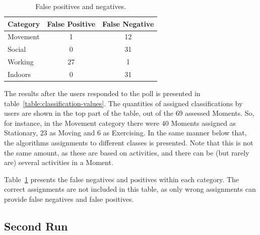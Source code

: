 \begin{table}
    \centering
    {\begin{tabular}{ | l | c | c |}
        \hline
            Category & False Positive & False Negative \\
        \hline
        Movement    & 1  & 12 \\
        Social      & 0  & 31 \\
        Working     & 27 & 1  \\
        Indoors     & 0  & 31 \\
        \hline
    \end{tabular}}
    \caption{False positives and negatives.} 
    \label{table:false-values-before}
\end{table}

The results after the users responded to the poll is presented in 
table~\ref{table:classification-values}. The quantities 
of assigned classifications by users are shown in the top part of the
table, out of the $69$ assessed Moments. So, for instance, in the 
Movement category there were $40$ Moments assigned as Stationary, 
$23$ as Moving and $6$ as Exercising. In the same manner below that, 
the algorithms assignments to different classes is presented. Note that
this is not the same amount, as these are based on activities, and there
can be (but rarely are) several activities in a Moment.

Table~\ref{table:false-values-before} presents the false negatives and 
positives within each category. The correct assignments are not included
in this table, as only wrong assignments can provide false negatives
and false positives.

\subsection{Second Run}

